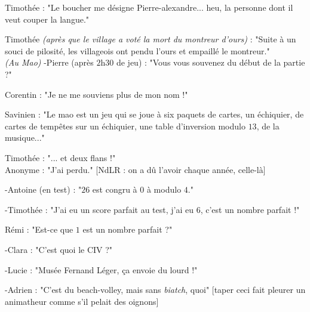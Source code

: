 \noindent Timothée : "Le boucher me désigne Pierre-alexandre... heu, la personne dont il veut couper la langue."

\noindent Timothée \textit{(après que le village a voté la mort du montreur d'ours)} : "Suite à un souci de pilosité, les villageois ont pendu l'ours et empaillé le montreur."
\\

\textit{(Au Mao)}
\noindent -Pierre (après $2$h$30$ de jeu) : "Vous vous souvenez du début de la partie ?" 

\noindent Corentin : "Je ne me souviens plus de mon nom !"

\noindent Savinien : "Le mao est un jeu qui se joue à six paquets de cartes, un échiquier, de cartes de tempêtes sur un échiquier, une table d'inversion modulo $13$, de la musique..."

\noindent Timothée : "... et deux flans !"
\\

\noindent Anonyme : "J'ai perdu." [NdLR : on a dû l'avoir chaque année, celle-là]

\noindent -Antoine (en test) : "$26$ est congru à $0$ à modulo $4$."

\noindent -Timothée : "J'ai eu un score parfait au test, j'ai eu $6$, c'est un nombre parfait !"

\noindent Rémi : "Est-ce que $1$ est un nombre parfait ?"

\noindent -Clara : "C'est quoi le CIV ?"

\noindent -Lucie : "Musée Fernand Léger, ça envoie du lourd !"

\noindent -Adrien : "C'est du beach-volley, mais sans \textit{biatch}, quoi" [taper ceci fait pleurer un animatheur comme s'il pelait des oignons]